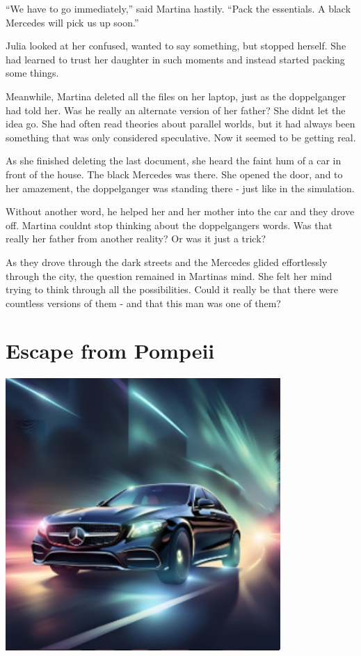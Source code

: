 \documentclass[
]{article}
\begin{document}
``We have to go immediately,'' said Martina hastily. ``Pack the
essentials. A black Mercedes will pick us up soon.''

Julia looked at her confused, wanted to say something, but stopped
herself. She had learned to trust her daughter in such moments and
instead started packing some things.

Meanwhile, Martina deleted all the files on her laptop, just as the
doppelganger had told her. Was he really an alternate version of her
father? She didn\textquotesingle t let the idea go. She had often read
theories about parallel worlds, but it had always been something that
was only considered speculative. Now it seemed to be getting real.

As she finished deleting the last document, she heard the faint hum of a
car in front of the house. The black Mercedes was there. She opened the
door, and to her amazement, the doppelganger was standing there - just
like in the simulation.

Without another word, he helped her and her mother into the car and they
drove off. Martina couldn\textquotesingle t stop thinking about the
doppelganger\textquotesingle s words. Was that really her father from
another reality? Or was it just a trick?

As they drove through the dark streets and the Mercedes glided
effortlessly through the city, the question remained in
Martina\textquotesingle s mind. She felt her mind trying to think
through all the possibilities. Could it really be that there were
countless versions of them - and that this man was one of them?

\section{Escape from Pompeii}\label{escape-from-pompeii}

\includegraphics[width=4.11614in,height=4.08663in]{media/image15.png}
\end{document}
